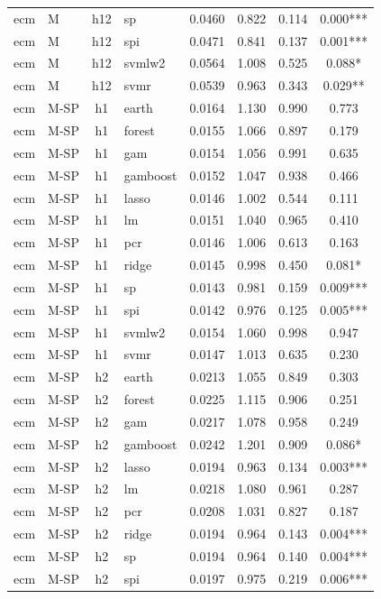 \begin{ThreePartTable}
\begin{longtable}[t]{llclcccc}
ecm & M & h12 & sp & 0.0460 & 0.822 & 0.114 & 0.000***\\
ecm & M & h12 & spi & 0.0471 & 0.841 & 0.137 & 0.001***\\
ecm & M & h12 & svmlw2 & 0.0564 & 1.008 & 0.525 & 0.088*\\
ecm & M & h12 & svmr & 0.0539 & 0.963 & 0.343 & 0.029**\\
\addlinespace
ecm & M-SP & h1 & earth & 0.0164 & 1.130 & 0.990 & 0.773\\
ecm & M-SP & h1 & forest & 0.0155 & 1.066 & 0.897 & 0.179\\
ecm & M-SP & h1 & gam & 0.0154 & 1.056 & 0.991 & 0.635\\
ecm & M-SP & h1 & gamboost & 0.0152 & 1.047 & 0.938 & 0.466\\
ecm & M-SP & h1 & lasso & 0.0146 & 1.002 & 0.544 & 0.111\\
ecm & M-SP & h1 & lm & 0.0151 & 1.040 & 0.965 & 0.410\\
ecm & M-SP & h1 & pcr & 0.0146 & 1.006 & 0.613 & 0.163\\
ecm & M-SP & h1 & ridge & 0.0145 & 0.998 & 0.450 & 0.081*\\
ecm & M-SP & h1 & sp & 0.0143 & 0.981 & 0.159 & 0.009***\\
ecm & M-SP & h1 & spi & 0.0142 & 0.976 & 0.125 & 0.005***\\
ecm & M-SP & h1 & svmlw2 & 0.0154 & 1.060 & 0.998 & 0.947\\
ecm & M-SP & h1 & svmr & 0.0147 & 1.013 & 0.635 & 0.230\\
\addlinespace
ecm & M-SP & h2 & earth & 0.0213 & 1.055 & 0.849 & 0.303\\
ecm & M-SP & h2 & forest & 0.0225 & 1.115 & 0.906 & 0.251\\
ecm & M-SP & h2 & gam & 0.0217 & 1.078 & 0.958 & 0.249\\
ecm & M-SP & h2 & gamboost & 0.0242 & 1.201 & 0.909 & 0.086*\\
ecm & M-SP & h2 & lasso & 0.0194 & 0.963 & 0.134 & 0.003***\\
ecm & M-SP & h2 & lm & 0.0218 & 1.080 & 0.961 & 0.287\\
ecm & M-SP & h2 & pcr & 0.0208 & 1.031 & 0.827 & 0.187\\
ecm & M-SP & h2 & ridge & 0.0194 & 0.964 & 0.143 & 0.004***\\
ecm & M-SP & h2 & sp & 0.0194 & 0.964 & 0.140 & 0.004***\\
ecm & M-SP & h2 & spi & 0.0197 & 0.975 & 0.219 & 0.006***\\

\end{longtable}
\end{ThreePartTable}
